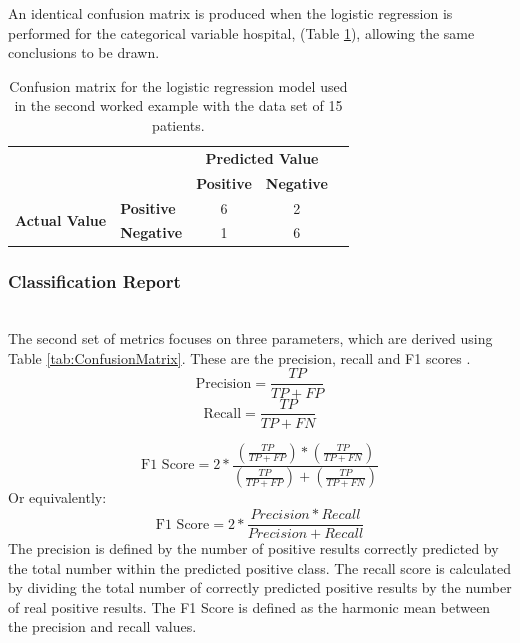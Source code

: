 \documentclass[../thesis.tex]{subfiles}
\begin{document}
An identical confusion matrix is produced when the logistic regression is performed for the categorical variable hospital, (Table \ref{tab:ConfusionMatrixEX1}), allowing the same conclusions to be drawn.

\begin{table}[h!]
    \centering
    \begin{tabular}{clccc} \toprule
    && \multicolumn{2}{c}{\textbf{Predicted Value} }\\
         && \textbf{Positive} & \textbf{Negative}  \\ \midrule
      \multirow{2}{*}{\textbf{Actual Value}} &\textbf{Positive}   & 6 & 2   \\
      &\textbf{Negative}  & 1 & 6\\ \bottomrule
    \end{tabular}
\caption{Confusion matrix for the logistic regression model used in the second worked example with the data set of 15 patients.}
\label{tab:ConfusionMatrixEX1}
\end{table}

\subsubsection{Classification Report}\\
The second set of metrics focuses on three parameters, which are derived using Table \ref{tab:ConfusionMatrix}. These are the precision, recall and F1 scores \cite{Baratloo2015}.
\begin{equation}\label{eq:precision}
    \text{Precision} = \frac{TP}{TP + FP}
\end{equation}
\begin{equation}\label{eq:recall}
    \text{Recall} = \frac{TP}{TP + FN}
\end{equation}

\begin{equation}
 \text{F1 Score} = 2 * \frac{(\frac{TP}{TP + FP}) *(\frac{TP}{TP + FN})}{(\frac{TP}{TP + FP}) + (\frac{TP}{TP + FN})}
\end{equation}
Or equivalently:
\begin{equation}\label{eq:f1score}
    \text{F1 Score} = 2 * \frac{Precision * Recall}{Precision + Recall}
\end{equation}
The precision is defined by the number of positive results correctly predicted by the total number within the predicted positive class. The recall score is calculated by dividing the total number of correctly predicted positive results by the number of real positive results. The F1 Score is defined as the harmonic mean between the precision and recall values.
\end{document}
